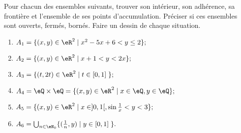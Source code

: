 \begin{exercice}[\boringexo]\label{exoEspVectoNorme0003}

Pour chacun des ensembles suivants, trouver son intérieur, son adhérence, sa frontière et l'ensemble de ses points d'accumulation. Préciser si ces ensembles sont ouverts, fermés, bornés. Faire un dessin de chaque situation.

	\begin{enumerate}
		\item	\label{ItemExoEVN3i}
 $A_1 = \{ (x, y ) \in \eR^2 \; | \; x^2 - 5x + 6 < y \leq 2 \} ;$
 \item\label{ItemExoEVN3ii}
 $A_2 = \{ (x, y ) \in \eR^2 \; | \; x+ 1 < y < 2x \} ;  $
 \item
$ A_3 = \{ ( t , 2t ) \in \eR^2 \; | \; t \in [0, 1] \; \} ; $
\item
$A_4 = \eQ \times \eQ = \{ (x, y ) \in \eR^2 \; | \; x \in \eQ , y \in \eQ \} ; $
\item
$A_5 = \{ (x, y ) \in \eR^2 \; | \; x \in ]0, 1[, \sin \frac 1x < y < 3 \} ;$
\item\label{ItemexoEspVectoNorme0003iv}
$A_6 = \bigcup _{ n \in \eN_0} \{ ( \frac 1n, y ) \; | \; y \in [0,1] \; \} .$

	\end{enumerate}

\end{exercice}
